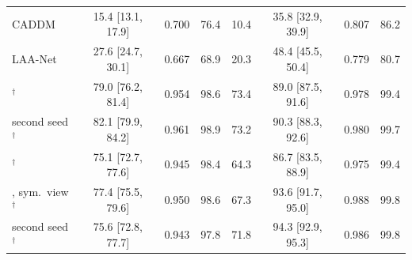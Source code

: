 \begin{tabular}{@{}l cccc ccc@{}}
CADDM~\cite{caddm} & 15.4 [13.1, 17.9] & 0.700 & 76.4 & 10.4 & 35.8 [32.9, 39.9] & 0.807 & 86.2 \\
LAA-Net~\cite{laanet} & 27.6 [24.7, 30.1] & 0.667 & 68.9 & 20.3 & 48.4 [45.5, 50.4] & 0.779 & 80.7 \\
\midrule
\oursB{}$^\dagger$ & 79.0 [76.2, 81.4] & 0.954 & 98.6 & 73.4 & 89.0 [87.5, 91.6] & 0.978 & 99.4 \\
\quad second seed$^\dagger$ & 82.1 [79.9, 84.2] & 0.961 & 98.9 & 73.2 & 90.3 [88.3, 92.6] & 0.980 & 99.7 \\
\oursF{}$^\dagger$ & 75.1 [72.7, 77.6] & 0.945 & 98.4 & 64.3 & 86.7 [83.5, 88.9] & 0.975 & 99.4 \\
\oursF{}, sym.\ view$^\dagger$ & 77.4 [75.5, 79.6] & 0.950 & 98.6 & 67.3 & 93.6 [91.7, 95.0] & 0.988 & 99.8 \\
\quad second seed$^\dagger$ & 75.6 [72.8, 77.7] & 0.943 & 97.8 & 71.8 & 94.3 [92.9, 95.3] & 0.986 & 99.8 \\
\bottomrule
\end{tabular}
